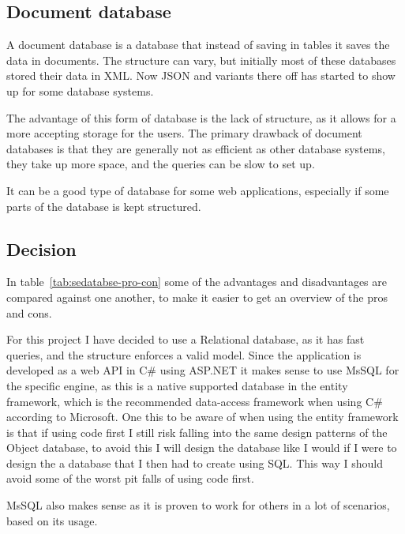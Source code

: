 \subsection{Document database}
\label{sub:Document database}
A document database is a database that instead of saving in tables it saves the
data in documents. The structure can vary, but initially most of these databases
stored their data in XML\cite{ibm:choosing_dbms}. Now JSON and variants there
off has started to show up for some database systems. 

The advantage of this form of database is the lack of structure, as it allows
for a more accepting storage for the users. The primary drawback of document
databases is that they are generally not as efficient as other database systems,
they take up more space, and the queries can be slow to set
up\cite{ibm:choosing_dbms}. 

It can be a good type of database for some web applications, especially if some
parts of the database is kept structured. 


\subsection{Decision }
\label{sub:database_decision}
In table~\ref{tab:sedatabse-pro-con} some of the advantages and disadvantages
are compared against one another, to make it easier to get an overview of the
pros and cons. 

For this project I have decided to use a Relational database, as it has fast
queries, and the structure enforces a valid model. Since the application is
developed as a web API in C\# using ASP.NET it makes sense to use MsSQL for the
specific engine, as this is a native supported database in the entity
framework, which is the recommended data-access framework when using C\#
according to Microsoft\cite{entity:microsoft}. One this to be aware of when
using the entity framework is that if using code first I still risk falling into
the same design patterns of the Object database, to avoid this I will design the
database like I would if I were to design the a database that I then had to
create using SQL. This way I should avoid some of the worst pit falls of using
code first. 

MsSQL also makes sense as it is proven to work for others in a lot of scenarios,
based on its usage\cite{obdms:gartner}. 


